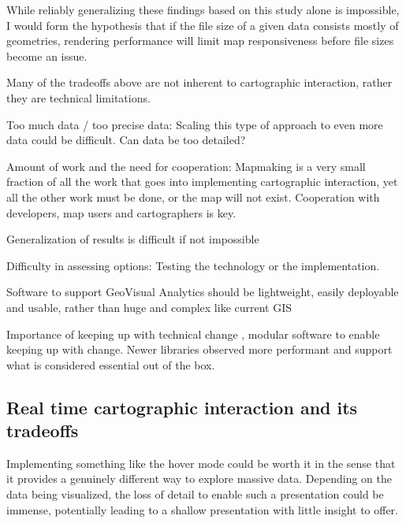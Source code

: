 While reliably generalizing these findings based on this study alone is impossible,
I would form the hypothesis that if the file size of a given data consists mostly of geometries,
rendering performance will limit map responsiveness before file sizes become an issue.

Many of the tradeoffs above are not inherent to cartographic interaction,
rather they are technical limitations.

Too much data / too precise data:
Scaling this type of approach to even more data could be difficult.
Can data be too detailed?

Amount of work and the need for cooperation:
Mapmaking is a very small fraction of all the work
that goes into implementing cartographic interaction,
yet all the other work must be done,
or the map will not exist.
Cooperation with developers, map users and cartographers is key.

Generalization of results is difficult if not impossible

Difficulty in assessing options: Testing the technology or the implementation.

Software to support GeoVisual Analytics should be lightweight, easily %
deployable and usable, rather than huge and complex like current GIS

Importance of keeping up with technical change \parencite{rot2014},
modular software to enable keeping up with change.
Newer libraries observed more performant and support what is considered essential out of the box.



\subsection{Real time cartographic interaction and its tradeoffs}

Implementing something like the hover mode could be worth it in the sense
that it provides a genuinely different way to explore massive data.
Depending on the data being visualized,
the loss of detail to enable such a presentation could be immense,
potentially leading to a shallow presentation with little insight to offer.

